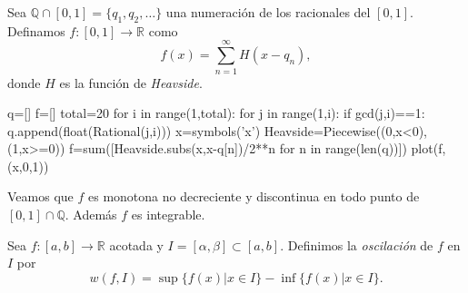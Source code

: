\begin{ejemplo} Sea $\mathbb{Q}\cap [0,1]=\{q_1,q_2,\ldots\}$ una numeración de los racionales del $[0,1]$. Definamos $f:[0,1]\to\mathbb{R}$ como
 \[
  f(x)=\sum_{n=1}^{\infty}H(x-q_n),
 \]
donde $H$ es la función de \emph{Heavside}. 
\begin{sympyverbatim}
q=[]
f=[]
total=20
for i in range(1,total):
    for j in range(1,i):
        if gcd(j,i)==1:
            q.append(float(Rational(j,i)))
x=symbols('x')
Heavside=Piecewise((0,x<0),(1,x>=0))
f=sum([Heavside.subs(x,x-q[n])/2**n for n in range(len(q))])
plot(f,(x,0,1))
\end{sympyverbatim}

Veamos que $f$ es monotona no decreciente y discontinua en todo punto de $[0,1]\cap \mathbb{Q}$. Además $f$ es integrable.


\end{ejemplo}
\begin{definicion} Sea $f:[a,b]\to\mathbb{R}$ acotada y $I=[\alpha,\beta]\subset [a,b]$. Definimos la \emph{oscilación} de $f$ en $I$ por 
\[
 w(f,I)=\sup\{f(x)| x\in I\}-\inf\{f(x)| x\in I\}.
\]
\end{definicion}

